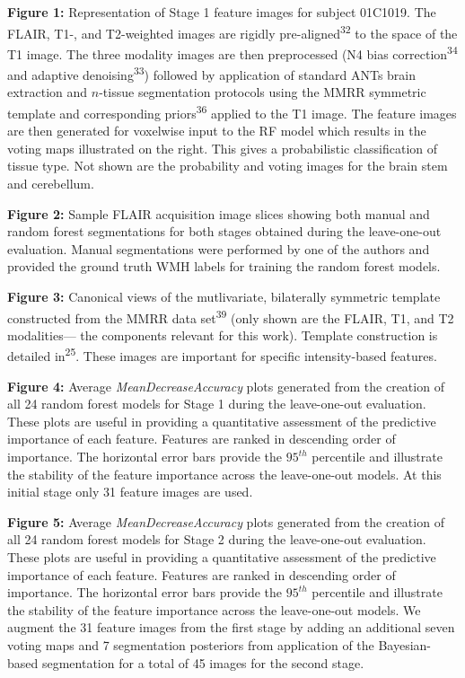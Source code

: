 \documentclass[11pt,]{article}
\begin{document}
\textbf{Figure 1:} Representation of Stage 1 feature images for subject
01C1019. The FLAIR, T1-, and T2-weighted images are rigidly
pre-aligned\textsuperscript{32} to the space of the T1 image. The three
modality images are then preprocessed (N4 bias
correction\textsuperscript{34} and adaptive
denoising\textsuperscript{33}) followed by application of standard ANTs
brain extraction and \(n\)-tissue segmentation protocols using the MMRR
symmetric template and corresponding priors\textsuperscript{36} applied
to the T1 image. The feature images are then generated for voxelwise
input to the RF model which results in the voting maps illustrated on
the right. This gives a probabilistic classification of tissue type. Not
shown are the probability and voting images for the brain stem and
cerebellum.

\textbf{Figure 2:} Sample FLAIR acquisition image slices showing both
manual and random forest segmentations for both stages obtained during
the leave-one-out evaluation. Manual segmentations were performed by one
of the authors and provided the ground truth WMH labels for training the
random forest models.

\textbf{Figure 3:} Canonical views of the mutlivariate, bilaterally
symmetric template constructed from the MMRR data
set\textsuperscript{39} (only shown are the FLAIR, T1, and T2
modalities--- the components relevant for this work). Template
construction is detailed in\textsuperscript{25}. These images are
important for specific intensity-based features.

\textbf{Figure 4:} Average \emph{MeanDecreaseAccuracy} plots generated
from the creation of all 24 random forest models for Stage 1 during the
leave-one-out evaluation. These plots are useful in providing a
quantitative assessment of the predictive importance of each feature.
Features are ranked in descending order of importance. The horizontal
error bars provide the \(95^{th}\) percentile and illustrate the
stability of the feature importance across the leave-one-out models. At
this initial stage only 31 feature images are used.

\textbf{Figure 5:} Average \emph{MeanDecreaseAccuracy} plots generated
from the creation of all 24 random forest models for Stage 2 during the
leave-one-out evaluation. These plots are useful in providing a
quantitative assessment of the predictive importance of each feature.
Features are ranked in descending order of importance. The horizontal
error bars provide the \(95^{th}\) percentile and illustrate the
stability of the feature importance across the leave-one-out models. We
augment the 31 feature images from the first stage by adding an
additional seven voting maps and 7 segmentation posteriors from
application of the Bayesian-based segmentation for a total of 45 images
for the second stage.
\end{document}
